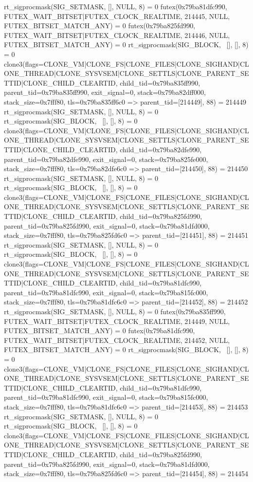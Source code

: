 \begin{breakableverbatim}
rt_sigprocmask(SIG_SETMASK, [], NULL, 8) = 0
futex(0x79ba81dfc990, FUTEX_WAIT_BITSET|FUTEX_CLOCK_REALTIME, 214445, NULL, FUTEX_BITSET_MATCH_ANY) = 0
futex(0x79ba825fd990, FUTEX_WAIT_BITSET|FUTEX_CLOCK_REALTIME, 214446, NULL, FUTEX_BITSET_MATCH_ANY) = 0
rt_sigprocmask(SIG_BLOCK, ~[], [], 8)   = 0
clone3({flags=CLONE_VM|CLONE_FS|CLONE_FILES|CLONE_SIGHAND|CLONE_THREAD|CLONE_SYSVSEM|CLONE_SETTLS|CLONE_PARENT_SETTID|CLONE_CHILD_CLEARTID, child_tid=0x79ba835ff990, parent_tid=0x79ba835ff990, exit_signal=0, stack=0x79ba82dff000, stack_size=0x7fff80, tls=0x79ba835ff6c0} => {parent_tid=[214449]}, 88) = 214449
rt_sigprocmask(SIG_SETMASK, [], NULL, 8) = 0
rt_sigprocmask(SIG_BLOCK, ~[], [], 8)   = 0
clone3({flags=CLONE_VM|CLONE_FS|CLONE_FILES|CLONE_SIGHAND|CLONE_THREAD|CLONE_SYSVSEM|CLONE_SETTLS|CLONE_PARENT_SETTID|CLONE_CHILD_CLEARTID, child_tid=0x79ba82dfe990, parent_tid=0x79ba82dfe990, exit_signal=0, stack=0x79ba825fe000, stack_size=0x7fff80, tls=0x79ba82dfe6c0} => {parent_tid=[214450]}, 88) = 214450
rt_sigprocmask(SIG_SETMASK, [], NULL, 8) = 0
rt_sigprocmask(SIG_BLOCK, ~[], [], 8)   = 0
clone3({flags=CLONE_VM|CLONE_FS|CLONE_FILES|CLONE_SIGHAND|CLONE_THREAD|CLONE_SYSVSEM|CLONE_SETTLS|CLONE_PARENT_SETTID|CLONE_CHILD_CLEARTID, child_tid=0x79ba825fd990, parent_tid=0x79ba825fd990, exit_signal=0, stack=0x79ba81dfd000, stack_size=0x7fff80, tls=0x79ba825fd6c0} => {parent_tid=[214451]}, 88) = 214451
rt_sigprocmask(SIG_SETMASK, [], NULL, 8) = 0
rt_sigprocmask(SIG_BLOCK, ~[], [], 8)   = 0
clone3({flags=CLONE_VM|CLONE_FS|CLONE_FILES|CLONE_SIGHAND|CLONE_THREAD|CLONE_SYSVSEM|CLONE_SETTLS|CLONE_PARENT_SETTID|CLONE_CHILD_CLEARTID, child_tid=0x79ba81dfc990, parent_tid=0x79ba81dfc990, exit_signal=0, stack=0x79ba815fc000, stack_size=0x7fff80, tls=0x79ba81dfc6c0} => {parent_tid=[214452]}, 88) = 214452
rt_sigprocmask(SIG_SETMASK, [], NULL, 8) = 0
futex(0x79ba835ff990, FUTEX_WAIT_BITSET|FUTEX_CLOCK_REALTIME, 214449, NULL, FUTEX_BITSET_MATCH_ANY) = 0
futex(0x79ba81dfc990, FUTEX_WAIT_BITSET|FUTEX_CLOCK_REALTIME, 214452, NULL, FUTEX_BITSET_MATCH_ANY) = 0
rt_sigprocmask(SIG_BLOCK, ~[], [], 8)   = 0
clone3({flags=CLONE_VM|CLONE_FS|CLONE_FILES|CLONE_SIGHAND|CLONE_THREAD|CLONE_SYSVSEM|CLONE_SETTLS|CLONE_PARENT_SETTID|CLONE_CHILD_CLEARTID, child_tid=0x79ba81dfc990, parent_tid=0x79ba81dfc990, exit_signal=0, stack=0x79ba815fc000, stack_size=0x7fff80, tls=0x79ba81dfc6c0} => {parent_tid=[214453]}, 88) = 214453
rt_sigprocmask(SIG_SETMASK, [], NULL, 8) = 0
rt_sigprocmask(SIG_BLOCK, ~[], [], 8)   = 0
clone3({flags=CLONE_VM|CLONE_FS|CLONE_FILES|CLONE_SIGHAND|CLONE_THREAD|CLONE_SYSVSEM|CLONE_SETTLS|CLONE_PARENT_SETTID|CLONE_CHILD_CLEARTID, child_tid=0x79ba825fd990, parent_tid=0x79ba825fd990, exit_signal=0, stack=0x79ba81dfd000, stack_size=0x7fff80, tls=0x79ba825fd6c0} => {parent_tid=[214454]}, 88) = 214454

\end{breakableverbatim}
